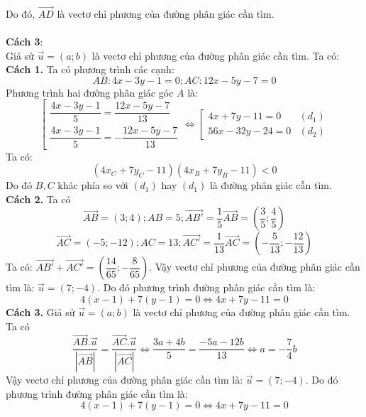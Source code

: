 \\Do đó, $\overrightarrow{AD}$ là vectơ chỉ phương của đường phân giác cần tìm.\\
\\
\textbf{Cách 3}: \\
Giả sử $\vec{u}=(a;b)$ là vectơ chỉ phương của đường phân giác cần tìm. Ta có: \\
\lgi
\textbf{Cách 1.}
Ta có phương trình các cạnh:
$$AB: 4x-3y-1=0; AC: 12x-5y-7=0$$
Phương trình hai đường phân giác góc $A$ là:
$$\left[ \begin{array}{l}
\dfrac{4x-3y-1}{5}=\dfrac{12x-5y-7}{13}\\ \dfrac{4x-3y-1}{5}=-\dfrac{12x-5y-7}{13}
\end{array} \right. \Leftrightarrow \left[ \begin{array}{lc}
4x+7y-11=0 &  (d_1) \\56x-32y-24=0 & (d_2)
\end{array} \right.$$
Ta có:
$$\left(4x_C + 7y_C -11 \right)\left(4x_B + 7y_B-11 \right) <0$$
Do đó $B,C$ khác phía so với $(d_1)$ hay $(d_1)$ là đường phân giác cần tìm.\\
\textbf{Cách 2.}
Ta có $$\overrightarrow{AB} = (3;4); AB=5; \overrightarrow{AB'}=\dfrac{1}{5}\overrightarrow{AB}=\left(\dfrac{3}{5};\dfrac{4}{5}\right)$$
$$\overrightarrow{AC} = (-5;-12); AC=13; \overrightarrow{AC'}=\dfrac{1}{13}\overrightarrow{AC}=\left(-\dfrac{5}{13};-\dfrac{12}{13}\right)$$
Ta có: $\overrightarrow{AB'}+\overrightarrow{AC'}=\left(\dfrac{14}{65};-\dfrac{8}{65}\right)$. Vậy vectơ chỉ phương của đường phân giác cần tìm là: $\vec{u}= (7;-4)$.
Do đó phương trình đường phân giác cần tìm là:
\begin{displaymath}
4(x-1)+7(y-1)=0 \Leftrightarrow 4x+7y-11=0 \end{displaymath}
\textbf{Cách 3.}
Giả sử $\vec{u}=(a;b)$ là vectơ chỉ phương của đường phân giác cần tìm. Ta có $$\dfrac{\overrightarrow{AB}.\vec{u}}{\left|\overrightarrow{AB}\right|} = \dfrac{\overrightarrow{AC}.\vec{u}}{\left|\overrightarrow{AC}\right| } \Leftrightarrow \dfrac{3a+4b}{5}=\dfrac{-5a-12b}{13} \Leftrightarrow a=-\dfrac{7}{4}b$$
Vậy vectơ chỉ phương của đường phân giác cần tìm là: $\vec{u}= (7;-4)$.
Do đó phương trình đường phân giác cần tìm là:
\begin{displaymath}
4(x-1)+7(y-1)=0 \Leftrightarrow 4x+7y-11=0 \end{displaymath}
